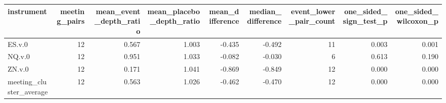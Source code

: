 \begin{tabular}{lrrrrrrrr}
\toprule
instrument & meeting_pairs & mean_event_depth_ratio & mean_placebo_depth_ratio & mean_difference & median_difference & event_lower_pair_count & one_sided_sign_test_p & one_sided_wilcoxon_p \\
\midrule
ES.v.0 & 12 & 0.567 & 1.003 & -0.435 & -0.492 & 11 & 0.003 & 0.001 \\
NQ.v.0 & 12 & 0.951 & 1.033 & -0.082 & -0.030 & 6 & 0.613 & 0.190 \\
ZN.v.0 & 12 & 0.171 & 1.041 & -0.869 & -0.849 & 12 & 0.000 & 0.000 \\
meeting_cluster_average & 12 & 0.563 & 1.026 & -0.462 & -0.470 & 12 & 0.000 & 0.000 \\
\bottomrule
\end{tabular}
